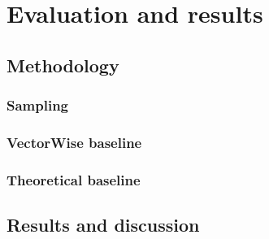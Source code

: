 
\chapter{Evaluation and results} %





% 

\section{Methodology}
\subsection{Sampling}
\subsection{VectorWise baseline}
\subsection{Theoretical baseline}

\section{Results and discussion}

